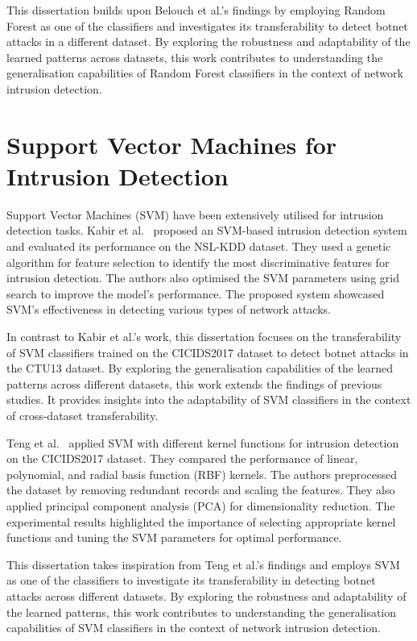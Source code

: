 This dissertation builds upon Belouch et al.’s findings by employing Random Forest as one of the classifiers and investigates its transferability to detect botnet attacks in a different dataset. By exploring the robustness and adaptability of the learned patterns across datasets, this work contributes to understanding the generalisation capabilities of Random Forest classifiers in the context of network intrusion detection.

\section{Support Vector Machines for Intrusion Detection}\label{sec:SVMIntrusion}

Support Vector Machines (SVM) have been extensively utilised for intrusion detection tasks. Kabir et al.~\cite{kabir2017network} proposed an SVM-based intrusion detection system and evaluated its performance on the NSL-KDD dataset. They used a genetic algorithm for feature selection to identify the most discriminative features for intrusion detection. The authors also optimised the SVM parameters using grid search to improve the model’s performance. The proposed system showcased SVM’s effectiveness in detecting various types of network attacks.

In contrast to Kabir et al.’s work, this dissertation focuses on the transferability of SVM classifiers trained on the CICIDS2017 dataset to detect botnet attacks in the CTU13 dataset. By exploring the generalisation capabilities of the learned patterns across different datasets, this work extends the findings of previous studies. It provides insights into the adaptability of SVM classifiers in the context of cross-dataset transferability.

Teng et al.~\cite{teng2017svm} applied SVM with different kernel functions for intrusion detection on the CICIDS2017 dataset. They compared the performance of linear, polynomial, and radial basis function (RBF) kernels. The authors preprocessed the dataset by removing redundant records and scaling the features. They also applied principal component analysis (PCA) for dimensionality reduction. The experimental results highlighted the importance of selecting appropriate kernel functions and tuning the SVM parameters for optimal performance.

This dissertation takes inspiration from Teng et al.’s findings and employs SVM as one of the classifiers to investigate its transferability in detecting botnet attacks across different datasets. By exploring the robustness and adaptability of the learned patterns, this work contributes to understanding the generalisation capabilities of SVM classifiers in the context of network intrusion detection.

